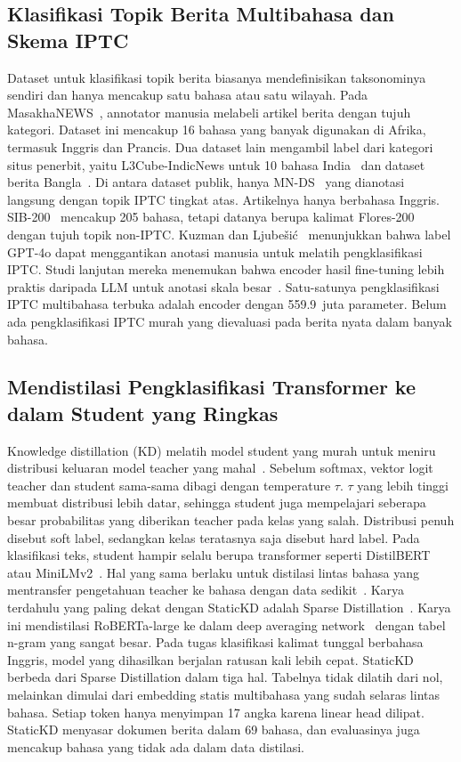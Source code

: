 \documentclass[journal]{IEEEtran}
\begin{document}
\subsection{Klasifikasi Topik Berita Multibahasa dan Skema IPTC}
Dataset untuk klasifikasi topik berita biasanya mendefinisikan taksonominya sendiri dan hanya mencakup satu bahasa atau satu wilayah. Pada MasakhaNEWS~\cite{adelani2023masakhanews}, annotator manusia melabeli artikel berita dengan tujuh kategori. Dataset ini mencakup 16 bahasa yang banyak digunakan di Afrika, termasuk Inggris dan Prancis. Dua dataset lain mengambil label dari kategori situs penerbit, yaitu L3Cube-IndicNews untuk 10 bahasa India~\cite{mirashi2023indicnews} dan dataset berita Bangla~\cite{hossain2025banglanews}. Di antara dataset publik, hanya MN-DS~\cite{petukhova2023mnds} yang dianotasi langsung dengan topik IPTC tingkat atas. Artikelnya hanya berbahasa Inggris. SIB-200~\cite{adelani2024sib200} mencakup 205 bahasa, tetapi datanya berupa kalimat Flores-200 dengan tujuh topik non-IPTC. Kuzman dan Ljube\v{s}i\'c~\cite{kuzman2025llm} menunjukkan bahwa label GPT-4o dapat menggantikan anotasi manusia untuk melatih pengklasifikasi IPTC. Studi lanjutan mereka menemukan bahwa encoder hasil fine-tuning lebih praktis daripada LLM untuk anotasi skala besar~\cite{kuzman2025southslavic}. Satu-satunya pengklasifikasi IPTC multibahasa terbuka adalah encoder dengan 559.9~juta parameter. Belum ada pengklasifikasi IPTC murah yang dievaluasi pada berita nyata dalam banyak bahasa.

\subsection{Mendistilasi Pengklasifikasi Transformer ke dalam Student yang Ringkas}
Knowledge distillation (KD) melatih model student yang murah untuk meniru distribusi keluaran model teacher yang mahal~\cite{hinton2015distilling,yang2025kdsurvey}. Sebelum softmax, vektor logit teacher dan student sama-sama dibagi dengan temperature $\tau$. $\tau$ yang lebih tinggi membuat distribusi lebih datar, sehingga student juga mempelajari seberapa besar probabilitas yang diberikan teacher pada kelas yang salah. Distribusi penuh disebut soft label, sedangkan kelas teratasnya saja disebut hard label. Pada klasifikasi teks, student hampir selalu berupa transformer seperti DistilBERT~\cite{sanh2019distilbert} atau MiniLMv2~\cite{wang2021minilmv2}. Hal yang sama berlaku untuk distilasi lintas bahasa yang mentransfer pengetahuan teacher ke bahasa dengan data sedikit~\cite{piperno2025crosslingual}. Karya terdahulu yang paling dekat dengan StaticKD adalah Sparse Distillation~\cite{ye2022sparse}. Karya ini mendistilasi RoBERTa-large ke dalam deep averaging network~\cite{iyyer2015dan} dengan tabel n-gram yang sangat besar. Pada tugas klasifikasi kalimat tunggal berbahasa Inggris, model yang dihasilkan berjalan ratusan kali lebih cepat. StaticKD berbeda dari Sparse Distillation dalam tiga hal. Tabelnya tidak dilatih dari nol, melainkan dimulai dari embedding statis multibahasa yang sudah selaras lintas bahasa. Setiap token hanya menyimpan 17 angka karena linear head dilipat. StaticKD menyasar dokumen berita dalam 69 bahasa, dan evaluasinya juga mencakup bahasa yang tidak ada dalam data distilasi.
\end{document}
